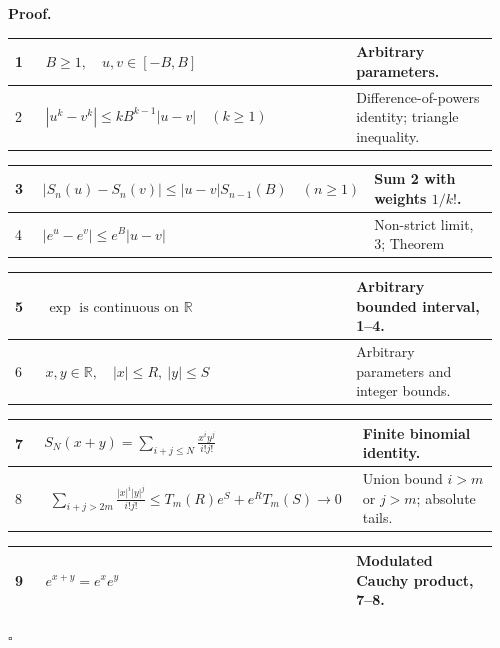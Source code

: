 \documentclass[11pt,reqno]{amsart}
\renewcommand{\arraystretch}{1.0}
\theoremstyle{redplain}
\renewcommand{\qedsymbol}{\textcolor{proofqed}{\ensuremath{\square}}}
\renewenvironment{proof}[1][Proof]{\par\noindent\textbf{\textcolor{proofhead}{#1.}}\par\nobreak}{\par\nobreak\hfill\qedsymbol}
\numberwithin{equation}{section}
\begin{document}
\begin{proof}
\smallskip \noindent {\ \setlength{\tabcolsep}{3pt}\renewcommand{%
\arraystretch}{1.18}}


\begin{tabular}{|@{}p{0.06\linewidth}p{0.61\linewidth}p{0.29\linewidth}}
\hline
1 & $B\ge1,\quad u,v\in[-B,B]$ & Arbitrary parameters. \\ \hline
2 & $|u^k-v^k|\le kB^{k-1}|u-v|\quad(k\ge1)$ & Difference-of-powers
identity; triangle inequality. \\ 
\end{tabular}%
\noindent \text{ \ }\newline
\noindent 
\begin{tabular}{|@{}p{0.06\linewidth}p{0.61\linewidth}p{0.29\linewidth}}
\hline
3 & $|S_n(u)-S_n(v)|\le |u-v|S_{n-1}(B)\quad(n\ge1)$ & Sum 2 with weights $%
1/k!$. \\ \hline
4 & $|e^u-e^v|\le e^B|u-v|$ & Non-strict limit, 3; Theorem~\ref%
{thm:uniform-tail}. \\ 
\end{tabular}
\noindent \text{ \ }\newline
\noindent 
\begin{tabular}{|@{}p{0.06\linewidth}p{0.61\linewidth}p{0.29\linewidth}}
\hline
5 & $\exp\text{ is continuous on }\mathbb{R}$ & Arbitrary bounded interval,
1--4. \\ \hline
6 & $x,y\in\mathbb{R},\quad |x|\le R,\ |y|\le S$ & Arbitrary parameters and
integer bounds. \\ 
\end{tabular}
\noindent \text{ \ }\newline
\noindent 
\begin{tabular}{|@{}p{0.06\linewidth}p{0.61\linewidth}p{0.29\linewidth}}
\hline
7 & $S_N(x+y)=\displaystyle\sum_{i+j\le N}\frac{x^iy^j}{i!j!}$ & Finite
binomial identity. \\ \hline
8 & \medskip \medskip $\begin{aligned}\sum_{i+j>2m}\frac{|x|^i|y|^j}{i!j!}
\le T_m(R)e^S+e^R T_m(S)\to0\end{aligned}$ & Union bound $i>m$ or $j>m$;
absolute tails. \\  
\end{tabular}%
\noindent \text{ \ }\newline
\noindent 
\begin{tabular}{|@{}p{0.06\linewidth}p{0.61\linewidth}p{0.29\linewidth}}
\hline
9 & $e^{x+y}=e^xe^y$ & Modulated Cauchy product, 7--8. \\ \hline

\end{tabular}
\end{proof}
\end{document}

